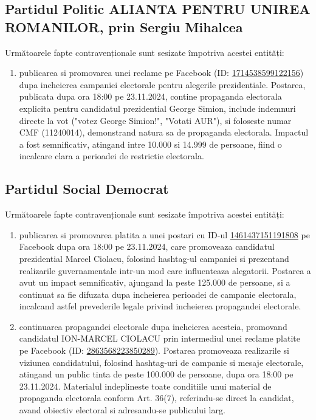 \documentclass[a4paper,12pt]{article}
\begin{document}
\vspace{0.5cm}

\subsection{Partidul Politic ALIANTA PENTRU UNIREA ROMANILOR, prin Sergiu Mihalcea}
Următoarele fapte contravenționale sunt sesizate împotriva acestei entități:

\begin{enumerate}[leftmargin=*, label=\arabic*.)]
    \item publicarea si promovarea unei reclame pe Facebook (ID: \href{https://www.facebook.com/ads/library/?id=1714538599122156}{1714538599122156}) dupa incheierea campaniei electorale pentru alegerile prezidentiale. Postarea, publicata dupa ora 18:00 pe 23.11.2024, contine propaganda electorala explicita pentru candidatul prezidential George Simion, include indemnuri directe la vot ("votez George Simion!", "Votati AUR"), si foloseste numar CMF (11240014), demonstrand natura sa de propaganda electorala. Impactul a fost semnificativ, atingand intre 10.000 si 14.999 de persoane, fiind o incalcare clara a perioadei de restrictie electorala.
\end{enumerate}

\vspace{0.5cm}

\subsection{Partidul Social Democrat}
Următoarele fapte contravenționale sunt sesizate împotriva acestei entități:

\begin{enumerate}[leftmargin=*, label=\arabic*.)]
    \item publicarea si promovarea platita a unei postari cu ID-ul \href{https://www.facebook.com/ads/library/?id=1461437151191808}{1461437151191808} pe Facebook dupa ora 18:00 pe 23.11.2024, care promoveaza candidatul prezidential Marcel Ciolacu, folosind hashtag-ul campaniei si prezentand realizarile guvernamentale intr-un mod care influenteaza alegatorii. Postarea a avut un impact semnificativ, ajungand la peste 125.000 de persoane, si a continuat sa fie difuzata dupa incheierea perioadei de campanie electorala, incalcand astfel prevederile legale privind incheierea propagandei electorale.
    \item continuarea propagandei electorale dupa incheierea acesteia, promovand candidatul ION-MARCEL CIOLACU prin intermediul unei reclame platite pe Facebook (ID: \href{https://www.facebook.com/ads/library/?id=2863568223850289}{2863568223850289}). Postarea promoveaza realizarile si viziunea candidatului, folosind hashtag-uri de campanie si mesaje electorale, atingand un public tinta de peste 100.000 de persoane, dupa ora 18:00 pe 23.11.2024. Materialul indeplineste toate conditiile unui material de propaganda electorala conform Art. 36(7), referindu-se direct la candidat, avand obiectiv electoral si adresandu-se publicului larg.
\end{enumerate}
\end{document}

